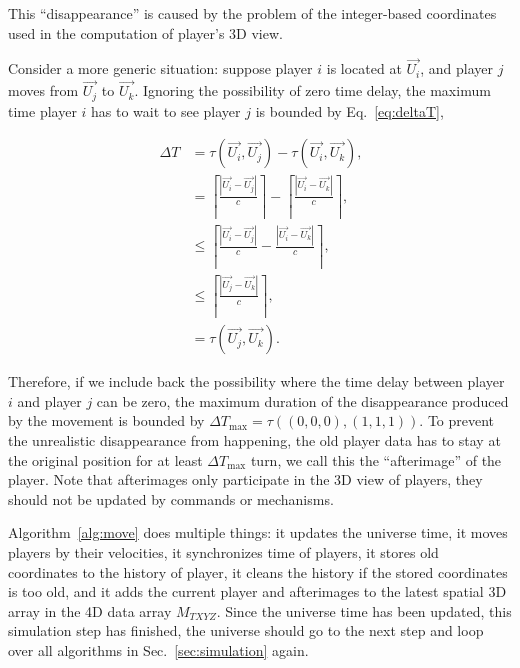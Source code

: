 \documentclass{svproc}
\begin{document}
This ``disappearance'' is caused by the problem of the integer-based coordinates used in the computation of player's 3D view.

Consider a more generic situation: suppose player $i$ is located at $\overrightarrow{U_i}$, 
and player $j$ moves from $\overrightarrow{U_j}$ to $\overrightarrow{U_k}$.
Ignoring the possibility of zero time delay, the maximum time player $i$ has to wait to see player $j$
is bounded by Eq.~\ref{eq:deltaT},

\begin{align} ~\label{eq:deltaT}
  \Delta T &= \tau(\overrightarrow{U_i}, \overrightarrow{U_j}) - \tau(\overrightarrow{U_i}, \overrightarrow{U_k}), \\
  &= \left \lceil \frac{|\overrightarrow{U_i} - \overrightarrow{U_j}|}{c} \right \rceil - \left \lceil \frac{|\overrightarrow{U_i} - \overrightarrow{U_k}|}{c} \right \rceil,  \\
  &\leq \left \lceil \frac{|\overrightarrow{U_i} - \overrightarrow{U_j}|}{c} - \frac{|\overrightarrow{U_i} - \overrightarrow{U_k}|}{c} \right \rceil, \\
  &\leq \left \lceil \frac{|\overrightarrow{U_j} - \overrightarrow{U_k}|}{c} \right \rceil, \\
  &=\tau(\overrightarrow{U_j}, \overrightarrow{U_k}).
\end{align}

Therefore, if we include back the possibility where the time delay between player $i$ and player $j$ can be zero,
the maximum duration of the disappearance produced by the movement is bounded by $\Delta T_{\textrm{max}} = \tau((0, 0, 0), (1, 1, 1))$.
To prevent the unrealistic disappearance from happening, the old player data has to stay at the original
position for at least $\Delta T_{\textrm{max}}$ turn, we call this the ``afterimage'' of the player.
Note that afterimages only participate in the 3D view of players, they should not be updated by commands or mechanisms.

Algorithm~\ref{alg:move} does multiple things: it updates the universe time, 
it moves players by their velocities, it synchronizes time of players,
it stores old coordinates to the history of player, it cleans the history if the stored coordinates is too old,
and it adds the current player and afterimages to the latest spatial 3D array in the 4D data array $M_{TXYZ}$.
Since the universe time has been updated, this simulation step has finished, 
the universe should go to the next step and loop over all algorithms in Sec.~\ref{sec:simulation} again.
\end{document}
